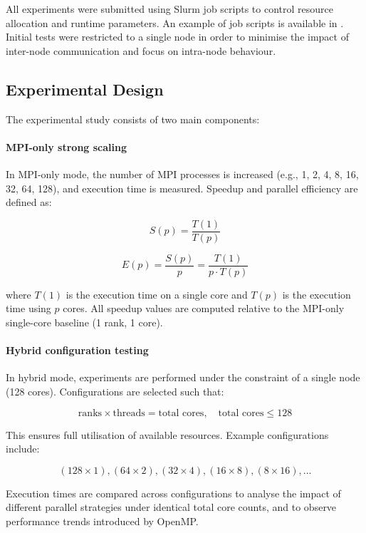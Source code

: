 \documentclass{article}
\begin{document}
All experiments were submitted using Slurm job scripts to control resource allocation and runtime parameters. 
An example of job scripts is available in \cite{petsc_scripts_repo}. 
Initial tests were restricted to a single node in order to minimise the impact of inter-node communication and focus on intra-node behaviour.


\subsection{Experimental Design}

The experimental study consists of two main components:

\paragraph{MPI-only strong scaling}

In MPI-only mode, the number of MPI processes is increased (e.g., 1, 2, 4, 8, 16, 32, 64, 128), 
and execution time is measured. 
Speedup and parallel efficiency are defined as:

\begin{equation}
S(p) = \frac{T(1)}{T(p)}
\end{equation}

\begin{equation}
E(p) = \frac{S(p)}{p} = \frac{T(1)}{p \cdot T(p)}
\end{equation}

where $T(1)$ is the execution time on a single core and $T(p)$ is the execution time using $p$ cores.
All speedup values are computed relative to the MPI-only single-core baseline (1 rank, 1 core).

\paragraph{Hybrid configuration testing}

In hybrid mode, experiments are performed under the constraint of a single node (128 cores). Configurations are selected such that:

\[
\text{ranks} \times \text{threads} = \text{total cores}, \quad \text{total cores} \leq 128
\]

This ensures full utilisation of available resources. Example configurations include:

\[
(128 \times 1), (64 \times 2), (32 \times 4), (16 \times 8), (8 \times 16), \dots
\]

Execution times are compared across configurations to analyse the impact of different parallel strategies under identical total core counts, and to observe performance trends introduced by OpenMP.
\end{document}

